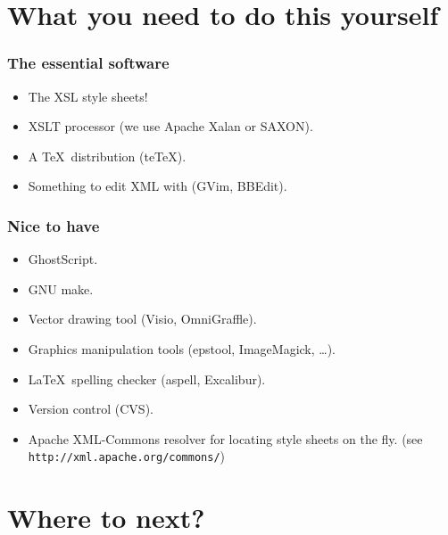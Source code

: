 \documentclass[pdftex]{beamer}
\begin{document}
\section[Software]{What you need to do this yourself}


\frame
{
	\frametitle{The essential software}
	
	\begin{itemize}
	
		\item The XSL style sheets!
	
		\item XSLT processor (we use Apache Xalan or SAXON).
		
		\item A \TeX\ distribution (te\TeX).
		
		\item Something to edit XML with (GVim, BBEdit).
		
	\end{itemize}
}


\frame
{
	\frametitle{Nice to have}
	
	\begin{itemize}
	
		\item GhostScript.
		
		\item GNU make.
		
		\item Vector drawing tool (Visio, OmniGraffle).
		
		\item Graphics manipulation tools (epstool, ImageMagick, \ldots).
		
		\item \LaTeX\ spelling checker (aspell, Excalibur).
		
		\item Version control (CVS).
		
		\item Apache XML-Commons resolver for locating style sheets on
		the fly. {\scriptsize (see \texttt{http://xml.apache.org/commons/})}
		
	
	\end{itemize}
}


\section[Future]{Where to next?}
\end{document}
